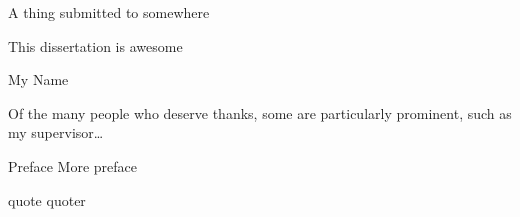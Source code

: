  {A thing submitted to somewhere}

\begin{abstract}%
   
\end{abstract}


\begin{declaration}
  This dissertation is awesome
  \vspace*{1cm}
  \begin{flushright}
    My Name
  \end{flushright}
\end{declaration}


\begin{acknowledgements}
  Of the many people who deserve thanks, some are particularly prominent,
  such as my supervisor\dots
\end{acknowledgements}


\begin{preface}
 Preface
  \noindent
 More preface
\end{preface}

\dedication{To me...}

\tableofcontents

\frontquote%
  {quote}%
  {quoter}


